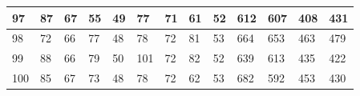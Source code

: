\documentclass[legalpaper,12pt]{article}
\begin{document}
\begin{table}[h]
\begin{tabular}{|l|l|l|l|l|l|l|l|l|l|l|l|l|}
97                                        & 87         & 67        & 55          & 49         & 77         & 71        & 61          & 52         & 612        & 607       & 408         & 431        \\ \hline
98                                        & 72         & 66        & 77          & 48         & 78         & 72        & 81          & 53         & 664        & 653       & 463         & 479        \\ \hline
99                                        & 88         & 66        & 79          & 50         & 101        & 72        & 82          & 52         & 639        & 613       & 435         & 422        \\ \hline
100                                       & 85         & 67        & 73          & 48         & 78         & 72        & 62          & 53         & 682        & 592       & 453         & 430        \\ \hline
\end{tabular}
\end{table}
\end{document}
